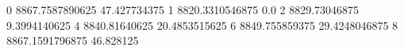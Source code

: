 0 8867.7587890625 47.427734375
1 8820.3310546875 0.0
2 8829.73046875 9.3994140625
4 8840.81640625 20.4853515625
6 8849.755859375 29.4248046875
8 8867.1591796875 46.828125
